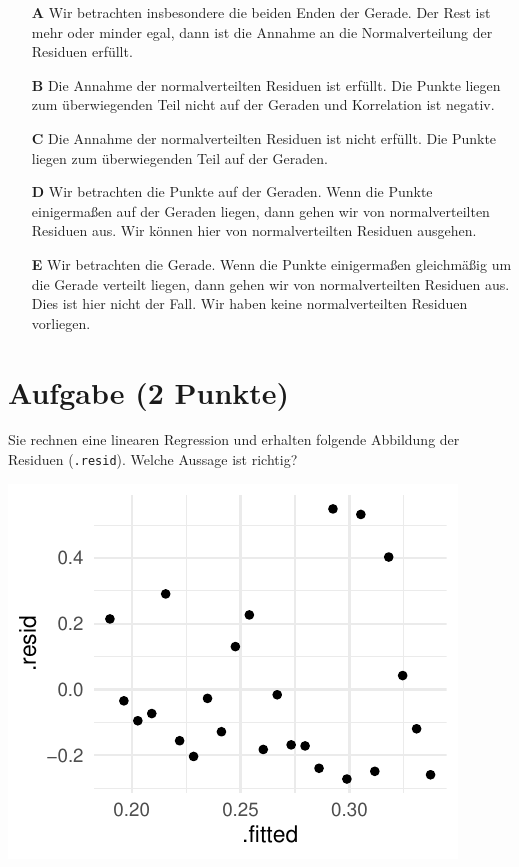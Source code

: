 \documentclass[a4paper, 9pt]{scrartcl}\usepackage[]{graphicx}\usepackage[]{xcolor}
\makeatletter
\def\maxwidth{ %
  \ifdim\Gin@nat@width>\linewidth
    \linewidth
  \else
    \Gin@nat@width
  \fi
}
\makeatother
\begin{document}
\begin{enumerate}
\item [\textbf{A} \msquare] Wir betrachten insbesondere die beiden Enden der Gerade. Der Rest ist mehr oder minder egal, dann ist die Annahme an die Normalverteilung der Residuen erfüllt.
\item [\textbf{B} \msquare] Die Annahme der normalverteilten Residuen ist erfüllt. Die Punkte liegen zum überwiegenden Teil nicht auf der Geraden und Korrelation ist negativ.
\item [\textbf{C} \msquare] Die Annahme der normalverteilten Residuen ist nicht erfüllt. Die Punkte liegen zum überwiegenden Teil auf der Geraden.
\item [\textbf{D} \msquare] Wir betrachten die Punkte auf der Geraden. Wenn die Punkte einigermaßen auf der Geraden liegen, dann gehen wir von normalverteilten Residuen aus. Wir können hier von normalverteilten Residuen ausgehen.
\item [\textbf{E} \msquare] Wir betrachten die Gerade. Wenn die Punkte einigermaßen gleichmäßig um die Gerade verteilt liegen, dann gehen wir von normalverteilten Residuen aus. Dies ist hier nicht der Fall. Wir haben keine normalverteilten Residuen vorliegen.
\end{enumerate}

\section{Aufgabe \hfill (2 Punkte)}



Sie rechnen eine linearen Regression und erhalten folgende Abbildung der Residuen (\texttt{.resid}). Welche Aussage ist richtig?



{\centering \includegraphics[width=\maxwidth]{img/mc-regression-06-a-1} 

}
\end{document}
